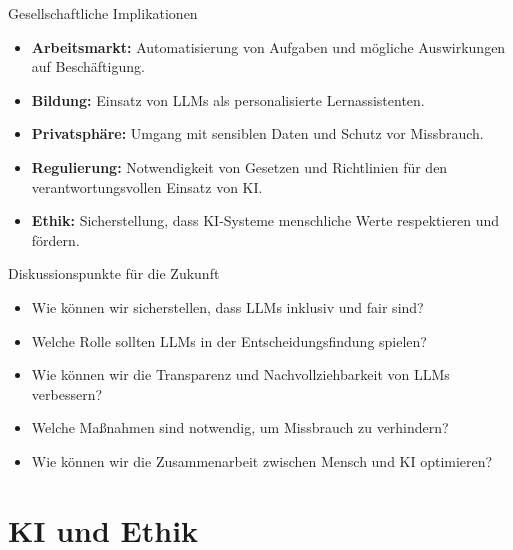 \documentclass[aspectratio=1610, xcolor=dvipsnames, 9pt]{beamer}
\begin{document}
\begin{frame}{Gesellschaftliche Implikationen}
  \begin{itemize}
    \item \textbf{Arbeitsmarkt:} Automatisierung von Aufgaben und mögliche Auswirkungen auf Beschäftigung. \\
    \item \textbf{Bildung:} Einsatz von LLMs als personalisierte Lernassistenten. \\
    \item \textbf{Privatsphäre:} Umgang mit sensiblen Daten und Schutz vor Missbrauch. \\
    \item \textbf{Regulierung:} Notwendigkeit von Gesetzen und Richtlinien für den verantwortungsvollen Einsatz von KI. \\
    \item \textbf{Ethik:} Sicherstellung, dass KI-Systeme menschliche Werte respektieren und fördern.
  \end{itemize}
\end{frame}

\begin{frame}{Diskussionspunkte für die Zukunft}
  \begin{itemize}
    \item Wie können wir sicherstellen, dass LLMs inklusiv und fair sind? \\
    \item Welche Rolle sollten LLMs in der Entscheidungsfindung spielen? \\
    \item Wie können wir die Transparenz und Nachvollziehbarkeit von LLMs verbessern? \\
    \item Welche Maßnahmen sind notwendig, um Missbrauch zu verhindern? \\
    \item Wie können wir die Zusammenarbeit zwischen Mensch und KI optimieren?
  \end{itemize}
\end{frame}

\section{KI und Ethik}
\end{document}
